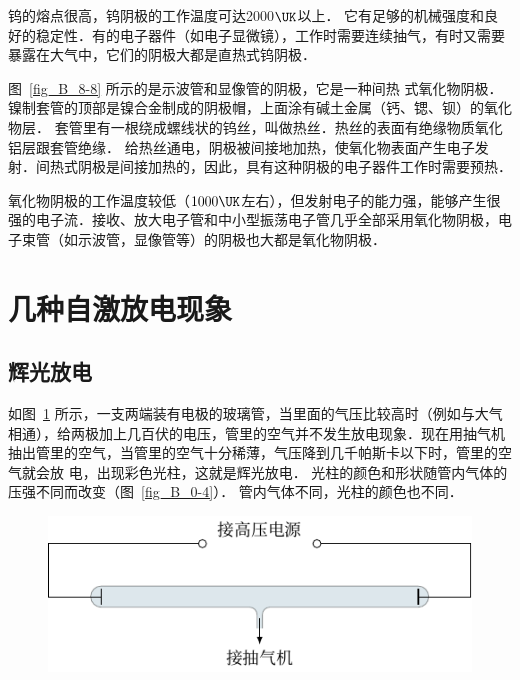 钨的熔点很高，钨阴极的工作温度可达2000$\UK$以上．
它有足够的机械强度和良好的稳定性．有的电子器件（如电子显微镜），工作时需要连续抽气，有时又需要暴露在大气中，它们的阴极大都是直热式钨阴极．

图~\ref{fig_B_8-8} 所示的是示波管和显像管的阴极，它是一种间热
式氧化物阴极．镍制套管的顶部是镍合金制成的阴极帽，上面涂有碱土金属（钙、锶、钡）的氧化物层．
套管里有一根绕成螺线状的钨丝，叫做热丝．热丝的表面有绝缘物质氧化铝层跟套管绝缘．
给热丝通电，阴极被间接地加热，使氧化物表面产生电子发射．间热式阴极是间接加热的，因此，具有这种阴极的电子器件工作时需要预热．

氧化物阴极的工作温度较低（$ 1000 \UK $左右），但发射电子的能力强，能够产生很强的电子流．接收、放大电子管和中小型振荡电子管几乎全部采用氧化物阴极，电子束管（如示波管，显像管等）的阴极也大都是氧化物阴极．

\section{几种自激放电现象}\label{sec_B-8-6}
\subsection{辉光放电}

如图~\ref{fig_B_8-9} 所示，一支两端装有电极的玻璃管，当里面的气压比较高时（例如与大气相通），给两极加上几百伏的电压，管里的空气并不发生放电现象．现在用抽气机抽出管里的空气，当管里的空气十分稀薄，气压降到几千帕斯卡以下时，管里的空气就会放
电，出现彩色光柱，这就是辉光放电．
光柱的颜色和形状随管内气体的压强不同而改变（图~\ref{fig_B_0-4}）．
管内气体不同，光柱的颜色也不同．

\begin{figure}[htbp]
	\centering
	\includegraphics{fig/B/8-9.pdf}
	\caption{}\label{fig_B_8-9}
\end{figure}

